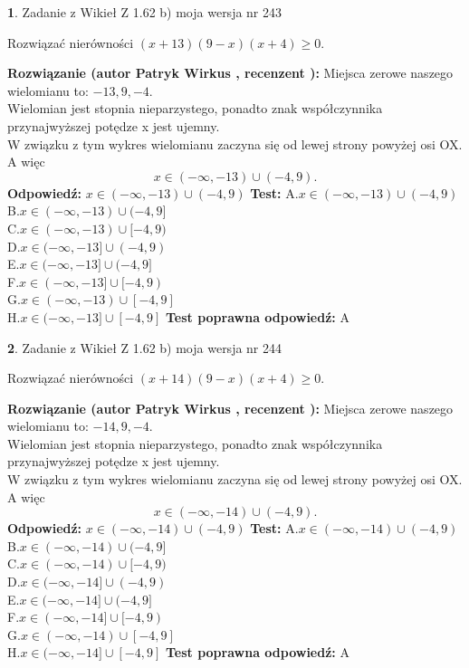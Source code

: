 \documentclass[12pt, a4paper]{article}
\theoremstyle{definition} %
\newtheorem{zad}{}
\newcommand{\zadStart}[1]{\begin{zad}#1\newline}
\newcommand{\zadStop}{\end{zad}}
\newcommand{\rozwStart}[2]{\noindent \textbf{Rozwiązanie (autor #1 , recenzent #2): }\newline}
\newcommand{\rozwStop}{\newline}
\newcommand{\odpStart}{\noindent \textbf{Odpowiedź:}\newline}
\newcommand{\odpStop}{\newline}
\newcommand{\testStart}{\noindent \textbf{Test:}\newline}
\newcommand{\testStop}{\newline}
\newcommand{\kluczStart}{\noindent \textbf{Test poprawna odpowiedź:}\newline}
\newcommand{\kluczStop}{\newline}
\begin{document}
\zadStart{Zadanie z Wikieł Z 1.62 b) moja wersja nr 243}

Rozwiązać nierówności $(x+13)(9-x)(x+4)\ge0$.
\zadStop
\rozwStart{Patryk Wirkus}{}
Miejsca zerowe naszego wielomianu to: $-13, 9, -4$.\\
Wielomian jest stopnia nieparzystego, ponadto znak współczynnika przy\linebreak najwyższej potędze x jest ujemny.\\ W związku z tym wykres wielomianu zaczyna się od lewej strony powyżej osi OX. A więc $$x \in (-\infty,-13) \cup (-4,9).$$
\rozwStop
\odpStart
$x \in (-\infty,-13) \cup (-4,9)$
\odpStop
\testStart
A.$x \in (-\infty,-13) \cup (-4,9)$\\
B.$x \in (-\infty,-13) \cup (-4,9]$\\
C.$x \in (-\infty,-13) \cup [-4,9)$\\
D.$x \in (-\infty,-13] \cup (-4,9)$\\
E.$x \in (-\infty,-13] \cup (-4,9]$\\
F.$x \in (-\infty,-13] \cup [-4,9)$\\
G.$x \in (-\infty,-13) \cup [-4,9]$\\
H.$x \in (-\infty,-13] \cup [-4,9]$
\testStop
\kluczStart
A
\kluczStop



\zadStart{Zadanie z Wikieł Z 1.62 b) moja wersja nr 244}

Rozwiązać nierówności $(x+14)(9-x)(x+4)\ge0$.
\zadStop
\rozwStart{Patryk Wirkus}{}
Miejsca zerowe naszego wielomianu to: $-14, 9, -4$.\\
Wielomian jest stopnia nieparzystego, ponadto znak współczynnika przy\linebreak najwyższej potędze x jest ujemny.\\ W związku z tym wykres wielomianu zaczyna się od lewej strony powyżej osi OX. A więc $$x \in (-\infty,-14) \cup (-4,9).$$
\rozwStop
\odpStart
$x \in (-\infty,-14) \cup (-4,9)$
\odpStop
\testStart
A.$x \in (-\infty,-14) \cup (-4,9)$\\
B.$x \in (-\infty,-14) \cup (-4,9]$\\
C.$x \in (-\infty,-14) \cup [-4,9)$\\
D.$x \in (-\infty,-14] \cup (-4,9)$\\
E.$x \in (-\infty,-14] \cup (-4,9]$\\
F.$x \in (-\infty,-14] \cup [-4,9)$\\
G.$x \in (-\infty,-14) \cup [-4,9]$\\
H.$x \in (-\infty,-14] \cup [-4,9]$
\testStop
\kluczStart
A
\kluczStop
\end{document}
